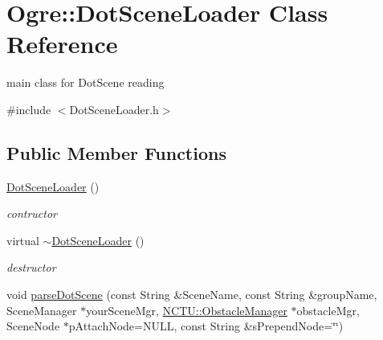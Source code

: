 \hypertarget{class_ogre_1_1_dot_scene_loader}{}\section{Ogre\+:\+:Dot\+Scene\+Loader Class Reference}
\label{class_ogre_1_1_dot_scene_loader}


main class for Dot\+Scene reading  




{\ttfamily \#include $<$Dot\+Scene\+Loader.\+h$>$}

\subsection*{Public Member Functions}
\begin{DoxyCompactItemize}
\item 
\hyperlink{class_ogre_1_1_dot_scene_loader_a4d3297139bca45e1130443d79b7b2e70}{Dot\+Scene\+Loader} ()\hypertarget{class_ogre_1_1_dot_scene_loader_a4d3297139bca45e1130443d79b7b2e70}{}\label{class_ogre_1_1_dot_scene_loader_a4d3297139bca45e1130443d79b7b2e70}

\begin{DoxyCompactList}\small\item\em contructor \end{DoxyCompactList}\item 
virtual \hyperlink{class_ogre_1_1_dot_scene_loader_a6a2e576a1adac9e7dd9c59548c02df47}{$\sim$\+Dot\+Scene\+Loader} ()\hypertarget{class_ogre_1_1_dot_scene_loader_a6a2e576a1adac9e7dd9c59548c02df47}{}\label{class_ogre_1_1_dot_scene_loader_a6a2e576a1adac9e7dd9c59548c02df47}

\begin{DoxyCompactList}\small\item\em destructor \end{DoxyCompactList}\item 
void \hyperlink{class_ogre_1_1_dot_scene_loader_a980e8d431568586740534e0c2fd596b1}{parse\+Dot\+Scene} (const String \&Scene\+Name, const String \&group\+Name, Scene\+Manager $\ast$your\+Scene\+Mgr, \hyperlink{class_n_c_t_u_1_1_obstacle_manager}{N\+C\+T\+U\+::\+Obstacle\+Manager} $\ast$obstacle\+Mgr, Scene\+Node $\ast$p\+Attach\+Node=N\+U\+LL, const String \&s\+Prepend\+Node=\char`\"{}\char`\"{})\hypertarget{class_ogre_1_1_dot_scene_loader_a980e8d431568586740534e0c2fd596b1}{}\label{class_ogre_1_1_dot_scene_loader_a980e8d431568586740534e0c2fd596b1}


\end{DoxyCompactItemize}

